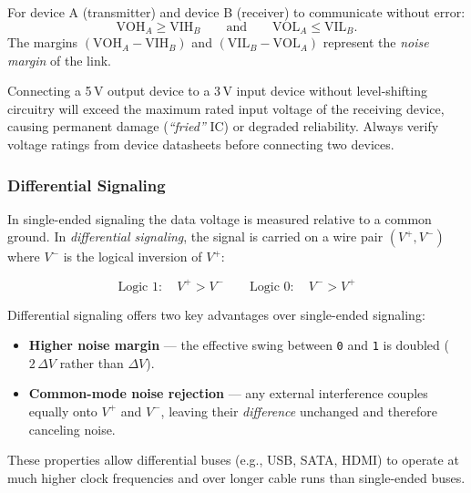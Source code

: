 \documentclass[11pt, a4paper, notitlepage]{report}
\theoremstyle{definition}
\theoremstyle{remark}
\theoremstyle{definition}
\begin{document}
\begin{keyresult}[title={Key Result: Logic Level Compatibility Conditions}]
  For device A (transmitter) and device B (receiver) to communicate without error:
  \[
    \mathrm{VOH}_A \geq \mathrm{VIH}_B \qquad \text{and} \qquad \mathrm{VOL}_A \leq \mathrm{VIL}_B.
  \]
  The margins $(\mathrm{VOH}_A - \mathrm{VIH}_B)$ and $(\mathrm{VIL}_B - \mathrm{VOL}_A)$ represent the \emph{noise margin} of the link.
\end{keyresult}

\begin{warning}[title={Warning: Voltage Mismatch Can Destroy Hardware}]
  Connecting a 5\,V output device to a 3\,V input device without level-shifting circuitry will exceed the maximum rated input voltage of the receiving device, causing permanent damage (\emph{``fried''} IC) or degraded reliability. Always verify voltage ratings from device datasheets before connecting two devices.
\end{warning}

\subsubsection{Differential Signaling}
\label{sec:differential}

In single-ended signaling the data voltage is measured relative to a common ground. In \emph{differential signaling}, the signal is carried on a wire pair $(V^+, V^-)$ where $V^-$ is the logical inversion of $V^+$:

\[
  \text{Logic } 1: \quad V^+ > V^- \qquad \text{Logic } 0: \quad V^- > V^+
\]

Differential signaling offers two key advantages over single-ended signaling:
\begin{itemize}
  \item \textbf{Higher noise margin} — the effective swing between \texttt{0} and \texttt{1} is doubled ($2\,\Delta V$ rather than $\Delta V$).
  \item \textbf{Common-mode noise rejection} — any external interference couples equally onto $V^+$ and $V^-$, leaving their \emph{difference} unchanged and therefore canceling noise.
\end{itemize}

These properties allow differential buses (e.g., USB, SATA, HDMI) to operate at much higher clock frequencies and over longer cable runs than single-ended buses.

\end{document}
